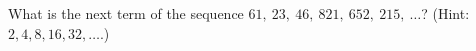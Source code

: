 What is the next term of the sequence $61,\ 23,\ 46,\ 821,\ 652,\ 215,\ \dots$? (Hint: $2,4,8,16,32,\dots$.)
